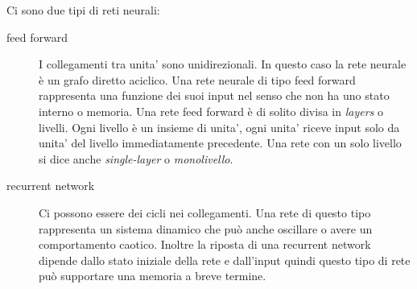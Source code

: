 Ci sono due tipi di reti neurali:
\begin{description}
  \item[feed forward]
    I collegamenti tra unita' sono unidirezionali. 
    In questo caso la rete neurale \`e un grafo diretto aciclico. 
    Una rete neurale di tipo feed forward rappresenta una funzione dei suoi input nel senso che non ha uno stato interno o memoria. 
    Una rete feed forward \`e di solito divisa in \emph{layers} o livelli. 
    Ogni livello \`e un insieme di unita', ogni unita' riceve input solo da unita' del livello immediatamente precedente. 
    Una rete con un solo livello si dice anche \emph{single-layer} o \emph{monolivello}.
  \item[recurrent network]
    Ci possono essere dei cicli nei collegamenti. 
    Una rete di questo tipo rappresenta un sistema dinamico che pu\`o anche oscillare o avere un comportamento caotico. 
    Inoltre la riposta di una recurrent network dipende dallo stato iniziale della rete e dall'input quindi questo tipo di rete pu\`o supportare una memoria a breve termine.
\end{description}

